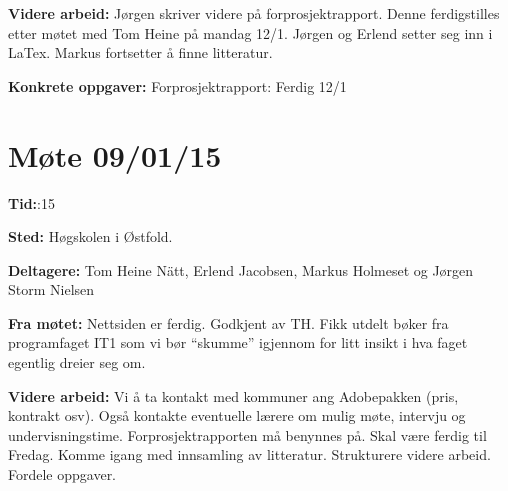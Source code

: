 \hspace{-17pt}\textbf{Videre arbeid:}\newline
Jørgen skriver videre på forprosjektrapport.\newline
Denne ferdigstilles etter møtet med Tom Heine på mandag 12/1.\newline 
Jørgen og Erlend setter seg inn i LaTex.\newline
Markus fortsetter å finne litteratur.\newline


\hspace{-17pt}\textbf{Konkrete oppgaver:}\newline
Forprosjektrapport: Ferdig 12/1\newline

\newpage


\section{Møte 09/01/15}

\vspace{30pt}
\textbf{Tid:}:15\newline

\hspace{-17pt}\textbf{Sted:}\newline 
Høgskolen i Østfold.\newline

\hspace{-17pt}\textbf{Deltagere:}\newline 
Tom Heine Nätt, Erlend Jacobsen, Markus Holmeset og Jørgen Storm Nielsen\newline

\hspace{-17pt}\textbf{Fra møtet:}\newline
Nettsiden er ferdig. Godkjent av TH.\newline
Fikk utdelt bøker fra programfaget IT1 som vi bør “skumme” igjennom for litt insikt i hva faget egentlig dreier seg om.\newline

\vspace{20pt}

\hspace{-17pt}\textbf{Videre arbeid:}\newline
Vi å ta kontakt med kommuner ang Adobepakken (pris, kontrakt osv). \newline
Også kontakte eventuelle lærere om mulig møte, intervju og undervisningstime.\newline
Forprosjektrapporten må benynnes på. Skal være ferdig til Fredag. \newline
Komme igang med innsamling av litteratur. \newline
Strukturere videre arbeid. Fordele oppgaver.\newline

